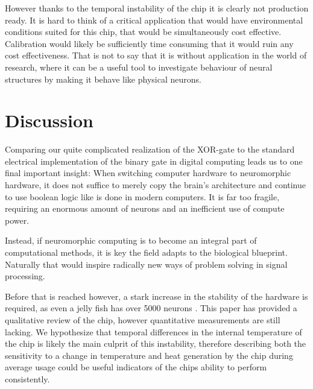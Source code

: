 \documentclass[10pt,a4paper]{article}
\begin{document}
However thanks to the temporal instability of the chip it is clearly not
production ready. It is hard to think of a critical application that would have
environmental conditions suited for this chip, that would be simultaneously cost
effective. Calibration would likely be sufficiently time consuming that it would
ruin any cost effectiveness. That is not to say that it is without application
in the world of research, where it can be a useful tool to investigate behaviour
of neural structures by making it behave like physical neurons.

\section{Discussion}
Comparing our quite complicated realization of the XOR-gate to the standard
electrical implementation of the binary gate in digital computing leads us to
one final important insight: When switching computer hardware to neuromorphic
hardware, it does not suffice to merely copy the brain's architecture and
continue to use boolean logic like is done in modern computers. It is far too
fragile, requiring an enormous amount of neurons and an inefficient use of
compute power.

Instead, if neuromorphic computing is to become an integral part of
computational methods, it is key the field adapts to the biological blueprint.
Naturally that would inspire radically new ways of problem solving in signal
processing.

Before that is reached however, a stark increase in the stability of the
hardware is required, as even a jelly fish has over 5000 neurons
\cite{neuronsjellyfish}. This paper has provided a qualitative review of the
chip, however quantitative measurements are still lacking. We hypothesize that
temporal differences in the internal temperature of the chip is likely the main
culprit of this instability, therefore describing both the sensitivity to a
change in temperature and heat generation by the chip during average usage could
be useful indicators of the chips ability to perform consistently.
\end{document}
